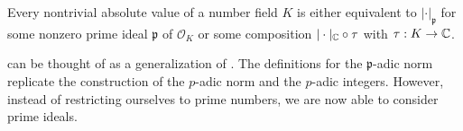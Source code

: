 \begin{theorem}
    Every nontrivial absolute value of a number field $K$ is either equivalent to $|\cdot|_\mathfrak{p}$ for some nonzero prime ideal $\mathfrak{p}$ of $\mathcal{O}_{K}$ or some composition $|\cdot|_{\mathbb{C}} \circ \tau$ with $\tau: K \to \mathbb{C}$.
\end{theorem}

 can be thought of as a generalization of . The definitions for the $\mathfrak{p}$-adic norm replicate the construction of the $p$-adic norm and the $p$-adic integers. However, instead of restricting ourselves to prime numbers, we are now able to consider prime ideals.


